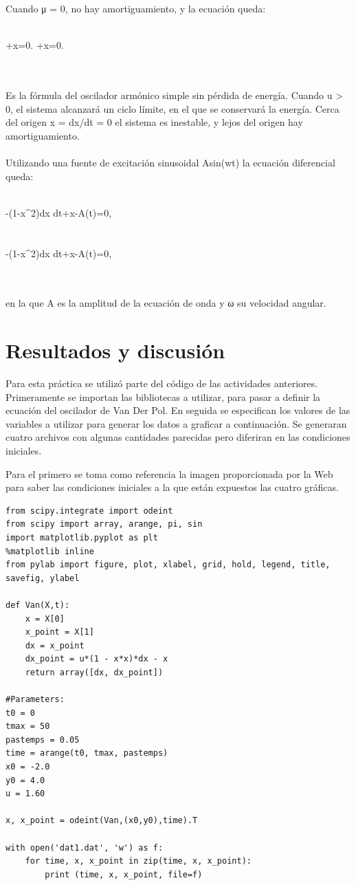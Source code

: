 \documentclass{article}
\begin{document}
Cuando μ = 0, no hay amortiguamiento, y la ecuación queda:
\\
\\
\begin{center}
{+x=0.} {+x=0.}
\end{center}
\\
\\
Es la fórmula del oscilador armónico simple sin pérdida de energía.
Cuando u > 0, el sistema alcanzará un ciclo límite, en el que se conservará la energía. Cerca del origen x = dx/dt = 0 el sistema es inestable, y lejos del origen hay amortiguamiento.
\\
\\
Utilizando una fuente de excitación sinusoidal Asin(wt) la ecuación diferencial queda:
\\
\\
\begin{center}
{-\mu (1-x^{2}){dx \over dt}+x-A\sin(\omega t)=0,}
\\
\\
\\
{-\mu (1-x^{2}){dx \over dt}+x-A\sin(\omega t)=0,}
\end{center}
\\
\\
en la que A es la amplitud de la ecuación de onda y ω su velocidad angular.

\section{Resultados y discusión}
Para esta práctica se utilizó parte del código de las actividades anteriores. Primeramente se importan las bibliotecas a utilizar, para pasar a definir la ecuación del oscilador de Van Der Pol. En seguida se especifican los valores de las variables a utilizar para generar los datos a graficar a continuación. Se generaran cuatro archivos con algunas cantidades parecidas pero diferiran en las condiciones iniciales.

Para el primero se toma como referencia la imagen proporcionada por la Web para saber las condiciones iniciales a la que están expuestos las cuatro gráficas.

\begin{verbatim}
from scipy.integrate import odeint 
from scipy import array, arange, pi, sin
import matplotlib.pyplot as plt
%matplotlib inline
from pylab import figure, plot, xlabel, grid, hold, legend, title, savefig, ylabel

def Van(X,t):
    x = X[0]
    x_point = X[1]
    dx = x_point
    dx_point = u*(1 - x*x)*dx - x
    return array([dx, dx_point])

#Parameters: 
t0 = 0
tmax = 50
pastemps = 0.05
time = arange(t0, tmax, pastemps)
x0 = -2.0
y0 = 4.0
u = 1.60

x, x_point = odeint(Van,(x0,y0),time).T

with open('dat1.dat', 'w') as f:
    for time, x, x_point in zip(time, x, x_point):
        print (time, x, x_point, file=f)
        
\end{verbatim}
\end{document}

